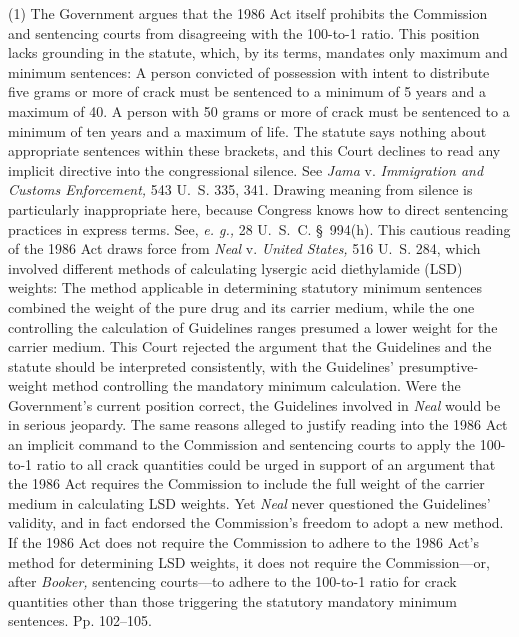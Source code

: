   (1) The Government argues that the 1986 Act itself prohibits the
Commission and sentencing courts from disagreeing with the 100-to-1
ratio. This position lacks grounding in the statute, which, by its
terms, mandates only maximum and minimum sentences: A person convicted
of possession with intent to distribute five grams or more of crack
must be sentenced to a minimum of 5 years and a maximum of 40. A person
with 50 grams or more of crack must be sentenced to a minimum of ten
years and a maximum of life. The statute says nothing about appropriate
sentences within these brackets, and this Court declines to read any
implicit directive into the congressional silence. See \emph{Jama} v.
\emph{Immigration and Customs Enforcement,} 543 U.~S. 335, 341. Drawing
meaning from silence is particularly inappropriate here, because
Congress knows how to direct sentencing practices in express terms.
See, \emph{e. g.,} 28 U.~S.~C. \S~994(h). This cautious reading
of the 1986 Act draws force from \emph{Neal} v. \emph{United States,}
516 U.~S. 284, which involved different methods of calculating
lysergic acid diethylamide (LSD) weights: The method applicable in
determining statutory minimum sentences combined the weight of the
pure drug and its carrier medium, while the one controlling the
calculation of Guidelines ranges presumed a lower weight for the carrier
medium. This Court rejected the argument that the Guidelines and the
statute should be interpreted consistently, with the Guidelines'
presumptive-weight method controlling the mandatory minimum calculation.
Were the Government's current position correct, the Guidelines
involved in \emph{Neal} would be in serious jeopardy. The same reasons
alleged to justify reading into the 1986 Act an implicit command to the
Commission and sentencing courts to apply the 100-to-1 ratio to all
crack quantities could be urged in support of an argument that the 1986
Act requires the Commission to include the full weight of the carrier
medium in calculating LSD weights. Yet \emph{Neal} never questioned the
Guidelines' validity, and in fact endorsed the Commission's freedom
to adopt a new method. If the 1986 Act does not require the Commission
to adhere to the 1986 Act's method for determining LSD weights, it
does not require the Commission---or, after \emph{Booker,} sentencing
courts---to adhere to the 100-to-1 ratio for crack quantities other
than those triggering the statutory mandatory minimum sentences. Pp.
102--105.\newpage 

